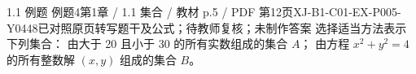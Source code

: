 \par\noindent\begin{minipage}{\linewidth}
\begin{bankitem}{1.1 例题 例题4}{第1章 / 1.1 集合 / 教材 p.5 / PDF 第12页}{XJ-B1-C01-EX-P005-Y0448}{已对照原页转写题干及公式；待教师复核；未制作答案}
选择适当方法表示下列集合：
由大于 20 且小于 30 的所有实数组成的集合 $A$；
由方程 $x^2+y^2=4$ 的所有整数解 $(x,y)$ 组成的集合 $B$。
\end{bankitem}
\end{minipage}\par\medskip
